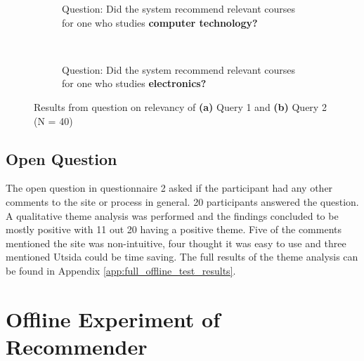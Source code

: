 \begin{figure}[h]
    \centering
    \begin{subfigure}[b]{0.4\textwidth}
        
        \caption{Question: Did the system recommend relevant courses for one who studies \textbf{computer technology?}}
        \label{fig:gull}
    \end{subfigure}
    ~ \qquad %
    \begin{subfigure}[b]{0.4\textwidth}
       
        \caption{Question: Did the system recommend relevant courses for one who studies \textbf{electronics?}}
        \label{fig:tiger}
    \end{subfigure}
    \caption{Results from question on relevancy of \textbf{(a)} Query 1 and \textbf{(b)} Query 2 (N = 40)}
    \label{fig:predesigned_2}
\end{figure}


\FloatBarrier

\subsection{Open Question}

The open question in questionnaire 2 asked if the participant had any other comments to the site or process in general. 20 participants answered the question. A qualitative theme analysis was performed and the findings concluded to be mostly positive with 11 out 20 having a positive theme. Five of the comments mentioned the site was non-intuitive, four thought it was easy to use and three mentioned Utsida could be time saving. The full results of the theme analysis can be found in Appendix \ref{app:full_offline_test_results}.

\FloatBarrier
\section{Offline Experiment of Recommender}

